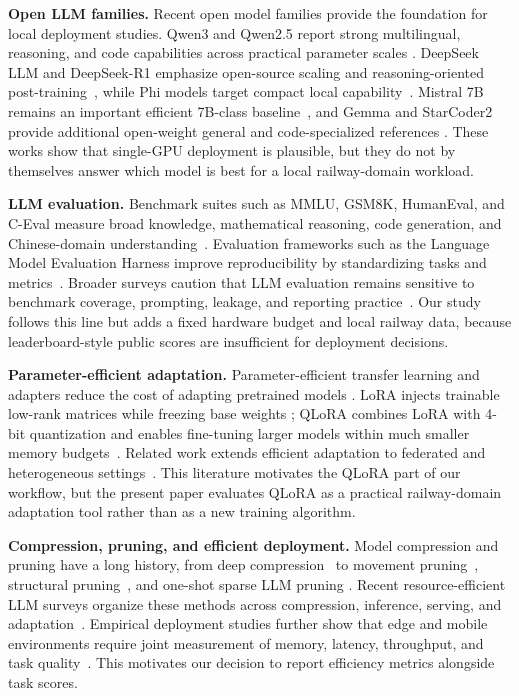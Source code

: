 \label{sec:related_work}

\textbf{Open LLM families.} Recent open model families provide the foundation
for local deployment studies. Qwen3 and Qwen2.5 report strong multilingual,
reasoning, and code capabilities across practical parameter scales
\cite{qwen3,qwen25}. DeepSeek LLM and DeepSeek-R1 emphasize open-source scaling
and reasoning-oriented post-training~\cite{deepseekllm,deepseekr1}, while Phi
models target compact local capability~\cite{phi3,phi4}. Mistral 7B remains an
important efficient 7B-class baseline~\cite{mistral7b}, and Gemma and StarCoder2
provide additional open-weight general and code-specialized references
\cite{gemma2024open,gemma2,gemma3,starcoder2}. These works show that
single-GPU deployment is plausible, but they do not by themselves answer which
model is best for a local railway-domain workload.

\textbf{LLM evaluation.} Benchmark suites such as MMLU, GSM8K, HumanEval, and
C-Eval measure broad knowledge, mathematical reasoning, code generation, and
Chinese-domain understanding~\cite{mmlu,gsm8k,humaneval,ceval}. Evaluation
frameworks such as the Language Model Evaluation Harness improve
reproducibility by standardizing tasks and metrics~\cite{lm_eval}. Broader
surveys caution that LLM evaluation remains sensitive to benchmark coverage,
prompting, leakage, and reporting practice~\cite{liang2022holistic,laskar2024systematic}. Our study follows this line but adds a fixed hardware
budget and local railway data, because leaderboard-style public scores are
insufficient for deployment decisions.

\textbf{Parameter-efficient adaptation.} Parameter-efficient transfer learning
and adapters reduce the cost of adapting pretrained models
\cite{houlsby2019parameter,mahabadi2021compacter,pfeiffer2020adapterfusion}.
LoRA injects trainable low-rank matrices while freezing base weights
\cite{lora}; QLoRA combines LoRA with 4-bit quantization and enables
fine-tuning larger models within much smaller memory budgets~\cite{qlora}.
Related work extends efficient adaptation to federated and heterogeneous
settings~\cite{zhang2023fedpetuning,yi2023fedlora,cho2023heterogeneous,cai2022fedadapter,yan2024federa,gao2024fedpt,chen2026federated}. This
literature motivates the QLoRA part of our workflow, but the present paper
evaluates QLoRA as a practical railway-domain adaptation tool rather than as a
new training algorithm.

\textbf{Compression, pruning, and efficient deployment.} Model compression and
pruning have a long history, from deep compression~\cite{han2015deep} to
movement pruning~\cite{sanh2020movement}, structural pruning~\cite{ma2023llm,xia2022structured,tao2023structured}, and one-shot sparse LLM pruning
\cite{frantar2023sparsegpt,sun2023simple}. Recent resource-efficient LLM
surveys organize these methods across compression, inference, serving, and
adaptation~\cite{bai2024beyond,yao2025deployment}. Empirical deployment studies
further show that edge and mobile environments require joint measurement of
memory, latency, throughput, and task quality~\cite{xiao2024mobile,dhar2024empirical,seymour2024small,wani2026benchmarking,zhao2024hetegen}.
This motivates our decision to report efficiency metrics alongside task scores.

